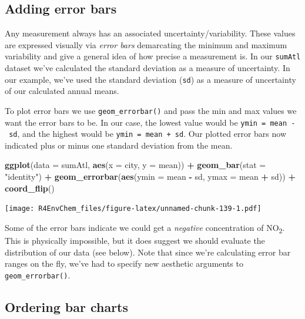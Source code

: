 \documentclass[
]{book}
\newenvironment{Shaded}{\begin{snugshade}}{\end{snugshade}}
\newcommand{\AttributeTok}[1]{\textcolor[rgb]{0.13,0.29,0.53}{#1}}
\newcommand{\FunctionTok}[1]{\textcolor[rgb]{0.13,0.29,0.53}{\textbf{#1}}}
\newcommand{\NormalTok}[1]{#1}
\newcommand{\SpecialCharTok}[1]{\textcolor[rgb]{0.81,0.36,0.00}{\textbf{#1}}}
\newcommand{\StringTok}[1]{\textcolor[rgb]{0.31,0.60,0.02}{#1}}
\begin{document}
\hypertarget{adding-error-bars}{%
\subsection{Adding error bars}\label{adding-error-bars}}

Any measurement always has an associated uncertainty/variability. These values are expressed visually via \emph{error bars} demarcating the minimum and maximum variability and give a general idea of how precise a measurement is. In our \texttt{sumAtl} dataset we've calculated the standard deviation as a measure of uncertainty. In our example, we've used the standard deviation (\texttt{sd}) as a measure of uncertainty of our calculated annual means.

To plot error bars we use \texttt{geom\_errorbar()} and pass the min and max values we want the error bars to be. In our case, the lowest value would be \texttt{ymin\ =\ mean\ -\ sd}, and the highest would be \texttt{ymin\ =\ mean\ +\ sd}. Our plotted error bars now indicated plus or minus one standard deviation from the mean.

\begin{Shaded}
\begin{Highlighting}[]
\FunctionTok{ggplot}\NormalTok{(}\AttributeTok{data =}\NormalTok{ sumAtl, }\FunctionTok{aes}\NormalTok{(}\AttributeTok{x =}\NormalTok{ city, }\AttributeTok{y =}\NormalTok{ mean)) }\SpecialCharTok{+}
  \FunctionTok{geom\_bar}\NormalTok{(}\AttributeTok{stat =} \StringTok{"identity"}\NormalTok{) }\SpecialCharTok{+}
  \FunctionTok{geom\_errorbar}\NormalTok{(}\FunctionTok{aes}\NormalTok{(}\AttributeTok{ymin =}\NormalTok{ mean }\SpecialCharTok{{-}}\NormalTok{ sd, }
                    \AttributeTok{ymax =}\NormalTok{ mean }\SpecialCharTok{+}\NormalTok{ sd)) }\SpecialCharTok{+}
  \FunctionTok{coord\_flip}\NormalTok{()}
\end{Highlighting}
\end{Shaded}

\texttt{[image: R4EnvChem\_files/figure-latex/unnamed-chunk-139-1.pdf]}

Some of the error bars indicate we could get a \emph{negative} concentration of NO\textsubscript{2}. This is physically impossible, but it does suggest we should evaluate the distribution of our data (see below). Note that since we're calculating error bar ranges on the fly, we've had to specify new aesthetic arguments to \texttt{geom\_errorbar()}.

\hypertarget{ordering-bar-charts}{%
\subsection{Ordering bar charts}\label{ordering-bar-charts}}
\end{document}
